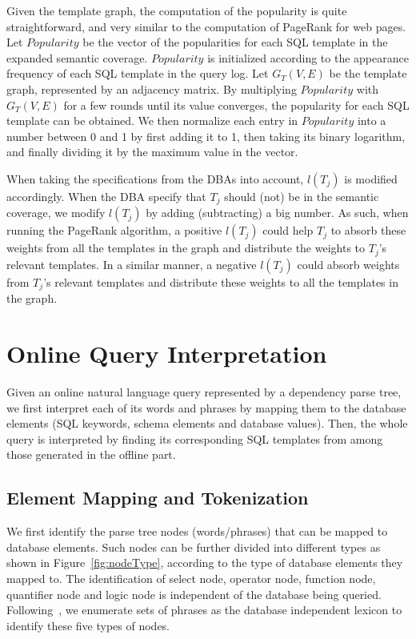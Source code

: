 \documentclass{vldb}
\begin{document}
Given the template graph, the computation of the popularity is quite straightforward, and very similar to the computation of PageRank for web pages.  Let $Popularity$ be the vector of the popularities for each SQL template in the expanded semantic coverage.  $Popularity$ is initialized according to the appearance frequency of each SQL template in the query log.  Let $G_T(V, E)$ be the template graph, represented by an adjacency matrix.  By multiplying $Popularity$ with $G_T(V, E)$ for a few rounds until its value converges, the popularity for each SQL template can be obtained.  We then normalize each entry in $Popularity$ into a number between 0 and 1 by first adding it to 1, then taking its binary logarithm, and finally dividing it by the maximum value in the vector.  

When taking the specifications from the DBAs into account, $l(T_j)$ is modified accordingly.  When the DBA specify that $T_j$ should (not) be in the semantic coverage, we modify $l(T_j)$ by adding (subtracting) a big number.  As such, when running the PageRank algorithm, a positive $l(T_j)$ could help $T_j$ to absorb these weights from all the templates in the graph and distribute the weights to $T_j$'s relevant templates.  In a similar manner, a negative $l(T_j)$ could absorb weights from $T_j$'s relevant templates and distribute these weights to all the templates in the graph.  

\section{Online Query Interpretation}
\label{sec:queryInterpretation}

Given an online natural language query represented by a dependency parse tree, we first interpret each of its words and phrases by mapping them to the database elements (SQL keywords, schema elements and database values).  Then, the whole query is interpreted by finding its corresponding SQL templates from among those generated in the offline part.  

\subsection{Element Mapping and Tokenization}
\label{subsec:tokenization}

We first identify the parse tree nodes (words/phrases) that can be mapped to database elements.  Such nodes can be further divided into different types as shown in Figure~\ref{fig:nodeType}, according to the type of database elements they mapped to.  The identification of select node, operator node, function node, quantifier node and logic node is independent of the database being queried.  Following~\cite{DBLP:journals/tods/LiYJ07,DBLP:journals/pvldb/LiJ14}, we enumerate sets of phrases as the database independent lexicon to identify these five types of nodes. 
\end{document}
